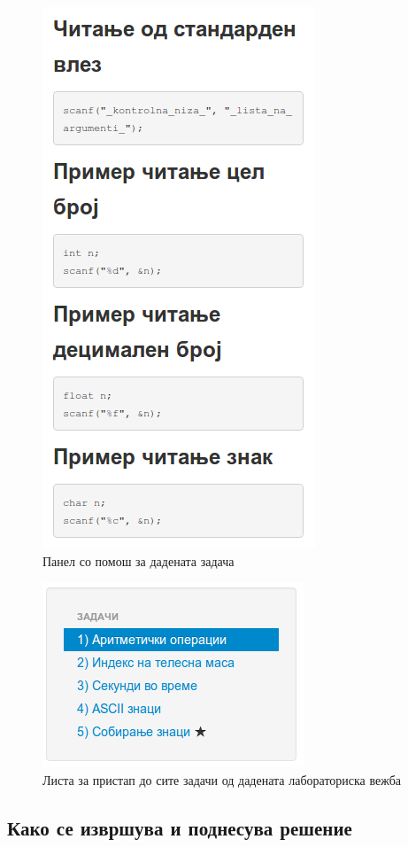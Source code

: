 \begin{figure}[htbp]
\centering
\includegraphics[scale=.5]{images/code/help}
\caption{Панел со помош за дадената задача}
\label{fig:help}
\end{figure}

\begin{figure}[htbp]
\centering
\includegraphics[scale=.5]{images/code/problems}
\caption{Листа за пристап до сите задачи од дадената лабораториска вежба}
\label{fig:problems}
\end{figure}

\subsection{Како се извршува и поднесува решение}

